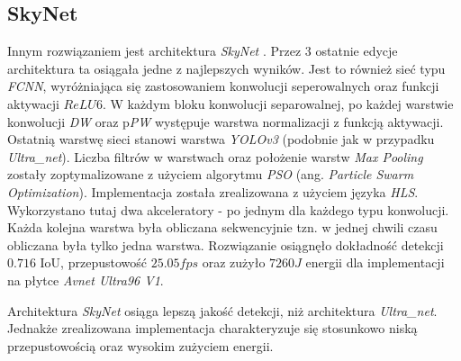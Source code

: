 \subsection{SkyNet}
Innym rozwiązaniem jest architektura \emph{SkyNet} \cite{skynet}. 
Przez 3 ostatnie edycje architektura ta osiągała jedne z najlepszych wyników.
Jest to również sieć typu \emph{FCNN}, wyróżniająca się zastosowaniem konwolucji seperowalnych oraz funkcji aktywacji $ReLU6$.
W każdym bloku konwolucji separowalnej, po każdej warstwie konwolucji \emph{DW} oraz p\emph{PW}  występuje warstwa normalizacji z funkcją aktywacji.
Ostatnią warstwę sieci stanowi warstwa \emph{YOLOv3} (podobnie jak w przypadku \emph{Ultra\_net}).
Liczba filtrów w warstwach oraz położenie warstw \textit{Max Pooling} zostały zoptymalizowane z użyciem algorytmu \emph{PSO} (ang. \emph{Particle Swarm Optimization}).
Implementacja została zrealizowana z użyciem języka \emph{HLS}.
Wykorzystano tutaj dwa akceleratory - po jednym dla każdego typu konwolucji.
Każda kolejna warstwa była obliczana sekwencyjnie tzn. w jednej chwili czasu obliczana była tylko jedna warstwa.  
Rozwiązanie osiągnęło dokładność detekcji $0.716$ IoU, przepustowość $25.05 fps$ oraz zużyło $7260 J$ energii dla implementacji na płytce \emph{Avnet Ultra96 V1}. 

Architektura \emph{SkyNet} osiąga lepszą jakość detekcji, niż architektura \emph{Ultra\_net}. 
Jednakże zrealizowana implementacja charakteryzuje się stosunkowo niską przepustowością oraz wysokim zużyciem energii.



